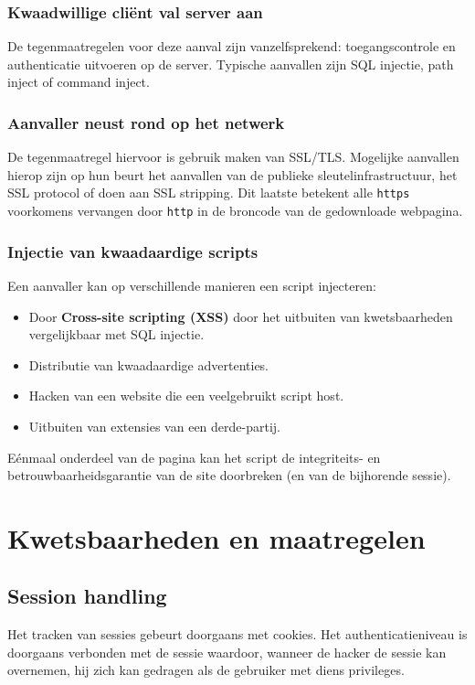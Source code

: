 \documentclass[../main.tex]{subfiles}
\begin{document}
\subsubsection{Kwaadwillige cli\"ent val server aan}
De tegenmaatregelen voor deze aanval zijn vanzelfsprekend: toegangscontrole en authenticatie uitvoeren op de server. Typische aanvallen zijn SQL injectie, path inject of command inject.

\subsubsection{Aanvaller neust rond op het netwerk}
De tegenmaatregel hiervoor is gebruik maken van SSL/TLS. Mogelijke aanvallen hierop zijn op hun beurt het aanvallen van de publieke sleutelinfrastructuur, het SSL protocol of doen aan SSL stripping. Dit laatste betekent alle \texttt{https} voorkomens vervangen door \texttt{http} in de broncode van de gedownloade webpagina.

\subsubsection{Injectie van kwaadaardige scripts}
Een aanvaller kan op verschillende manieren een script injecteren:
\begin{itemize}
	\item Door \textbf{Cross-site scripting (XSS)} door het uitbuiten van kwetsbaarheden vergelijkbaar met SQL injectie.
	\item Distributie van kwaadaardige advertenties.
	\item Hacken van een website die een veelgebruikt script host.
	\item Uitbuiten van extensies van een derde-partij.
\end{itemize}
E\'enmaal onderdeel van de pagina kan het script de integriteits- en betrouwbaarheidsgarantie van de site doorbreken (en van de bijhorende sessie).

\section{Kwetsbaarheden en maatregelen}

\subsection{Session handling}
Het tracken van sessies gebeurt doorgaans met cookies. Het authenticatieniveau is doorgaans verbonden met de sessie waardoor, wanneer de hacker de sessie kan overnemen, hij zich kan gedragen als de gebruiker met diens privileges.
\end{document}
